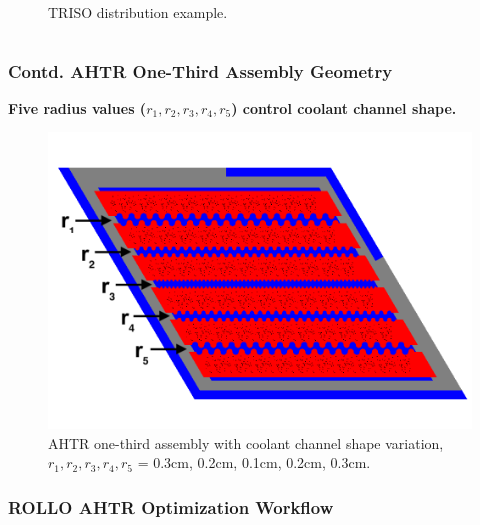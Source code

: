 \begin{frame}
\begin{columns}[t]
\begin{column}{0.5\textwidth}
\begin{figure}
                \caption{TRISO distribution example.}
            \end{figure}
        \end{column}
        \end{columns}
\end{frame}

\begin{frame}
    \frametitle{Contd. AHTR One-Third Assembly Geometry}
    \textbf{Five radius values (\textbf{$r_1, r_2, r_3, r_4, r_5$}) 
    control coolant channel shape.}
    \begin{figure}
        \includegraphics[width=0.7\linewidth]{../docs/figures/coolant-channel-shape-assem.png} 
        \caption{AHTR one-third assembly with coolant channel shape variation, 
        $r_1, r_2, r_3, r_4, r_5$ = 0.3cm, 0.2cm, 0.1cm, 0.2cm, 0.3cm.}
    \end{figure}
\end{frame}

\begin{frame}
    \frametitle{ROLLO AHTR Optimization Workflow}
    \vspace{-0.2cm}
    \begin{figure}
    \end{figure}
\end{frame}

